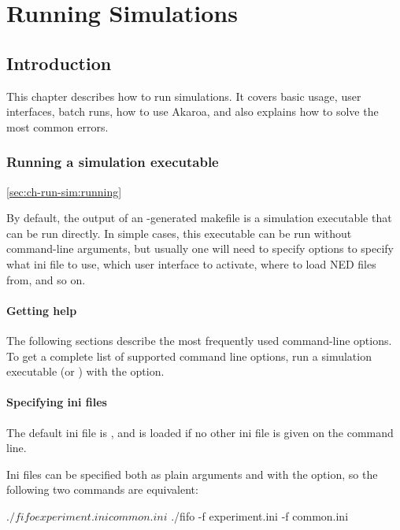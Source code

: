 \chapter{Running Simulations}
\label{cha:run-sim}

\section{Introduction}

This chapter describes how to run simulations. It covers basic usage,
user interfaces, batch runs, how to use Akaroa, and also explains
how to solve the most common errors.

\subsection{Running a simulation executable}
\ref{sec:ch-run-sim:running}

By default, the output of an -generated makefile is
a simulation executable that can be run directly. In simple cases,
this executable can be run without command-line arguments, but usually
one will need to specify options to specify what ini file to use,
which user interface to activate, where to load NED files from, and so on.

\subsubsection{Getting help}

The following sections describe the most frequently used command-line
options. To get a complete list of supported command line options, run
a simulation executable (or ) with the  option.


\subsubsection{Specifying ini files}

The default ini file is , and is
loaded if no other ini file is given on the command line.

Ini files can be specified both as plain arguments and with the 
option, so the following two commands are equivalent:

\begin{commandline}
$ ./fifo experiment.ini common.ini
$ ./fifo -f experiment.ini -f common.ini
\end{commandline}

